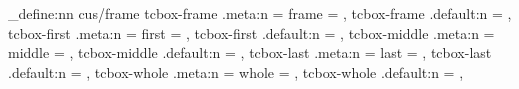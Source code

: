 
\def\tcb@proc@counter@with#1{%
  \csxdef{tcb@cnt@#1}{\kvtcb@new@counter}%
  \global\csletcs{thetcb@cnt@#1}{the\kvtcb@new@counter}%
  \appto\tcb@new@colopt{,code={\letcs\tcbcounter{tcb@cnt@#1}\letcs\thetcbcounter{thetcb@cnt@#1}}}%
}

\ExplSyntaxOn
\keys_define:nn { cus/frame }
  {
    tcbox-frame  .meta:n = { frame  = { \tcbox [{#1}] } } ,
    tcbox-frame .default:n = { } ,
    tcbox-first  .meta:n = { first  = { \tcbox [{#1}] } } ,
    tcbox-first .default:n = { } ,
    tcbox-middle .meta:n = { middle = { \tcbox [{#1}] } } ,
    tcbox-middle .default:n = { } ,
    tcbox-last   .meta:n = { last   = { \tcbox [{#1}] } } ,
    tcbox-last .default:n = { } ,
    tcbox-whole  .meta:n = { whole  = { \tcbox [{#1}] } } ,
    tcbox-whole .default:n = { } ,
  }
